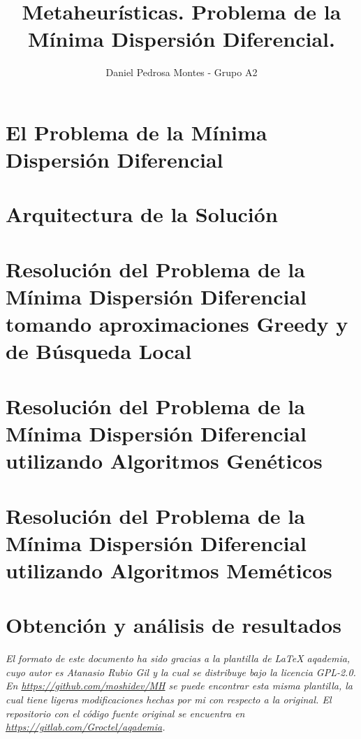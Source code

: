 \documentclass[10pt, a4paper]{aqademic}
\author{Daniel Pedrosa Montes - Grupo A2}
\title{Metaheurísticas. Problema de la Mínima Dispersión Diferencial.}
\begin{document}
\AqMaketitle[%
	cover    = identidad_ugr,
    dni      = {{DNI goes here}},
    email    = {{email goes here}},
	url      = https://github.com/moshidev/MH,
    date     = mayo del 2022
]

\tableofcontents

\chapter{El Problema de la Mínima Dispersión Diferencial}
    
    
\chapter{Arquitectura de la Solución}
    

\chapter{Resolución del Problema de la Mínima Dispersión Diferencial tomando aproximaciones Greedy y de Búsqueda Local}
    

\chapter{Resolución del Problema de la Mínima Dispersión Diferencial utilizando Algoritmos Genéticos}
    

\chapter{Resolución del Problema de la Mínima Dispersión Diferencial utilizando Algoritmos Meméticos}
    

\chapter{Obtención y análisis de resultados}
    




\vspace*{\fill}

\textit{%
El formato de este documento ha sido gracias a la plantilla de \LaTeX{} aqademia, cuyo autor es Atanasio Rubio Gil y la
cual se distribuye bajo la licencia GPL-2.0. En \url{https://github.com/moshidev/MH} se puede encontrar esta misma plantilla,
la cual tiene ligeras modificaciones hechas por mi con respecto a la original.
El repositorio con el código fuente original se encuentra en \url{https://gitlab.com/Groctel/aqademia}.
}
\end{document}
